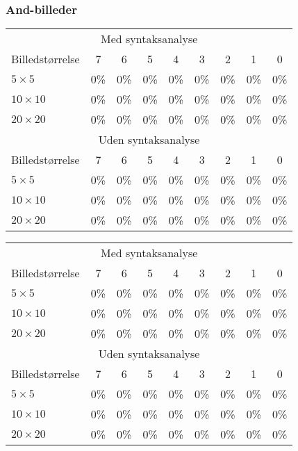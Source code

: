 \subsubsection*{And-billeder}

\begin{tabular}{|l|c|c|c|c|c|c|c|c|}\hline
\rowcolor[gray]{0.9} \multicolumn{9}{|>{\columncolor[gray]{0.9}}c|}{\textbf{Træningssæt}} \\\hline
\multicolumn{9}{|c|}{Med syntaksanalyse}\\\hline
Billedstørrelse & 7 & 6 & 5 & 4 & 3 & 2 & 1 & 0\\\hline
$5 \times 5$ & 0\% & 0\% & 0\% & 0\% & 0\% & 0\% & 0\% & 0\% \\\hline
$10 \times 10$ & 0\% & 0\% & 0\% & 0\% & 0\% & 0\% & 0\% & 0\%\\\hline
$20 \times 20$ & 0\% & 0\% & 0\% & 0\% & 0\% & 0\% & 0\% & 0\%\\\hline 
\multicolumn{9}{|c|}{Uden syntaksanalyse}\\\hline
Billedstørrelse & 7 & 6 & 5 & 4 & 3 & 2 & 1 & 0\\\hline
$5 \times 5$ & 0\% & 0\% & 0\% & 0\% & 0\% & 0\% & 0\% & 0\% \\\hline
$10 \times 10$ & 0\% & 0\% & 0\% & 0\% & 0\% & 0\% & 0\% & 0\%\\\hline
$20 \times 20$ & 0\% & 0\% & 0\% & 0\% & 0\% & 0\% & 0\% & 0\%\\\hline \end{tabular}

\begin{tabular}{|l|c|c|c|c|c|c|c|c|}\hline
\rowcolor[gray]{0.9} \multicolumn{9}{|>{\columncolor[gray]{0.9}}c|}{\textbf{Kontrolsæt}} \\\hline
\multicolumn{9}{|c|}{Med syntaksanalyse}\\\hline
Billedstørrelse & 7 & 6 & 5 & 4 & 3 & 2 & 1 & 0\\\hline
$5 \times 5$ & 0\% & 0\% & 0\% & 0\% & 0\% & 0\% & 0\% & 0\% \\\hline
$10 \times 10$ & 0\% & 0\% & 0\% & 0\% & 0\% & 0\% & 0\% & 0\%\\\hline
$20 \times 20$ & 0\% & 0\% & 0\% & 0\% & 0\% & 0\% & 0\% & 0\%\\\hline 
\multicolumn{9}{|c|}{Uden syntaksanalyse}\\\hline
Billedstørrelse & 7 & 6 & 5 & 4 & 3 & 2 & 1 & 0\\\hline
$5 \times 5$ & 0\% & 0\% & 0\% & 0\% & 0\% & 0\% & 0\% & 0\% \\\hline
$10 \times 10$ & 0\% & 0\% & 0\% & 0\% & 0\% & 0\% & 0\% & 0\%\\\hline
$20 \times 20$ & 0\% & 0\% & 0\% & 0\% & 0\% & 0\% & 0\% & 0\%\\\hline \end{tabular}

